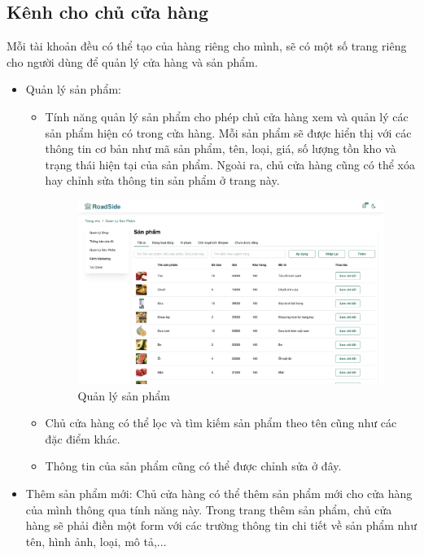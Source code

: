 \subsection{Kênh cho chủ cửa hàng}
Mỗi tài khoản đều có thể tạo của hàng riêng cho mình, sẽ có một số trang riêng cho người dùng để quản lý cửa hàng và sản phẩm.
\begin{itemize}
    \item Quản lý sản phẩm:
    \begin{itemize}
        \item Tính năng quản lý sản phẩm cho phép chủ cửa hàng xem và quản lý các sản phẩm hiện có trong cửa hàng. Mỗi sản phẩm sẽ được hiển thị với các thông tin cơ bản như mã sản phẩm, tên, loại, giá, số lượng tồn kho và trạng thái hiện tại của sản phẩm. Ngoài ra, chủ cửa hàng cũng có thể xóa hay chỉnh sửa thông tin sản phẩm ở trang này.
        \begin{figure}[H]
            \centering
            \includegraphics[width=0.95\linewidth] {Images/UI/shop_products.png}
            \vspace{1em}
            \caption{Quản lý sản phẩm}
        \end{figure}
        \item Chủ cửa hàng có thể lọc và tìm kiếm sản phẩm theo tên cũng như các đặc điểm khác.
        \item Thông tin của sản phẩm cũng có thể được chỉnh sửa ở đây.
    \end{itemize}
    \item Thêm sản phẩm mới: Chủ cửa hàng có thể thêm sản phẩm mới cho cửa hàng của mình thông qua tính năng này. Trong trang thêm sản phẩm, chủ cửa hàng sẽ phải điền một form với các trường thông tin chi tiết về sản phẩm như tên, hình ảnh, loại, mô tả,... 
        \begin{figure}[H]

\end{figure}
\end{itemize}
